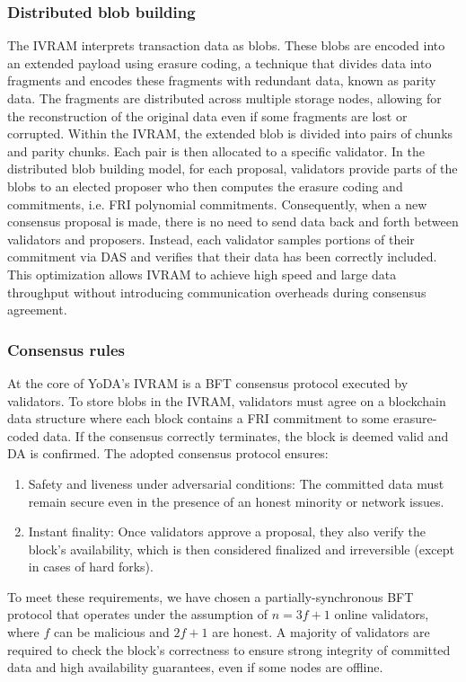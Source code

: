 \documentclass[11pt]{article}
\begin{document}
\subsubsection{Distributed blob building}
The IVRAM interprets transaction data as blobs. These blobs are encoded into an extended payload using erasure coding, a technique that divides data into fragments and encodes these fragments with redundant data, known as parity data. The fragments are distributed across multiple storage nodes, allowing for the reconstruction of the original data even if some fragments are lost or corrupted.
%
Within the IVRAM, the extended blob is divided into pairs of chunks and parity chunks. Each pair is then allocated to a specific validator. In the distributed blob building model, for each proposal, validators provide parts of the blobs to an elected proposer who then computes the erasure coding and commitments, i.e. FRI polynomial commitments. Consequently, when a new consensus proposal is made, there is no need to send data back and forth between validators and proposers. Instead, each validator samples portions of their commitment via DAS and verifies that their data has been correctly included. This optimization allows IVRAM to achieve high speed and large data throughput without introducing communication overheads during consensus agreement.

\subsubsection{Consensus rules}
At the core of YoDA’s IVRAM is a BFT consensus protocol executed by validators. To store blobs in the IVRAM, validators must agree on a blockchain data structure where each block contains a FRI commitment to some erasure-coded data. If the consensus correctly terminates, the block is deemed valid and DA is confirmed. The adopted consensus protocol ensures:
\begin{enumerate}
    \item Safety and liveness under adversarial conditions: The committed data must remain secure even in the presence of an honest minority or network issues.
    \item Instant finality: Once validators approve a proposal, they also verify the block’s availability, which is then considered finalized and irreversible (except in cases of hard forks).
\end{enumerate}

To meet these requirements, we have chosen a partially-synchronous BFT protocol that operates under the assumption of $n=3f+1$ online validators, where $f$ can be malicious and $2f+1$ are honest. A majority of validators are required to check the block’s correctness to ensure strong integrity of committed data and high availability guarantees, even if some nodes are offline.
\end{document}
